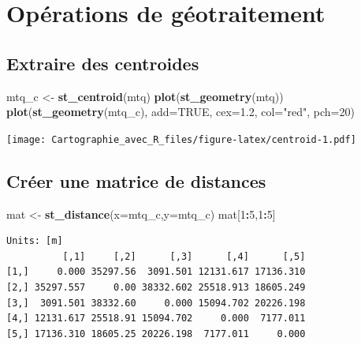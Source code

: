 \documentclass[]{book}
\newenvironment{Shaded}{\begin{snugshade}}{\end{snugshade}}
\newcommand{\KeywordTok}[1]{\textcolor[rgb]{0.13,0.29,0.53}{\textbf{#1}}}
\newcommand{\DataTypeTok}[1]{\textcolor[rgb]{0.13,0.29,0.53}{#1}}
\newcommand{\DecValTok}[1]{\textcolor[rgb]{0.00,0.00,0.81}{#1}}
\newcommand{\FloatTok}[1]{\textcolor[rgb]{0.00,0.00,0.81}{#1}}
\newcommand{\StringTok}[1]{\textcolor[rgb]{0.31,0.60,0.02}{#1}}
\newcommand{\OtherTok}[1]{\textcolor[rgb]{0.56,0.35,0.01}{#1}}
\newcommand{\OperatorTok}[1]{\textcolor[rgb]{0.81,0.36,0.00}{\textbf{#1}}}
\newcommand{\NormalTok}[1]{#1}
\begin{document}
\section{Opérations de géotraitement}\label{operations-de-geotraitement}

\subsection{Extraire des centroides}\label{extraire-des-centroides}

\begin{Shaded}
\begin{Highlighting}[]
\NormalTok{mtq_c <-}\StringTok{ }\KeywordTok{st_centroid}\NormalTok{(mtq)}
\KeywordTok{plot}\NormalTok{(}\KeywordTok{st_geometry}\NormalTok{(mtq))}
\KeywordTok{plot}\NormalTok{(}\KeywordTok{st_geometry}\NormalTok{(mtq_c), }\DataTypeTok{add=}\OtherTok{TRUE}\NormalTok{, }\DataTypeTok{cex=}\FloatTok{1.2}\NormalTok{, }\DataTypeTok{col=}\StringTok{"red"}\NormalTok{, }\DataTypeTok{pch=}\DecValTok{20}\NormalTok{)}
\end{Highlighting}
\end{Shaded}

\texttt{[image: Cartographie\_avec\_R\_files/figure-latex/centroid-1.pdf]}

\subsection{Créer une matrice de
distances}\label{creer-une-matrice-de-distances}

\begin{Shaded}
\begin{Highlighting}[]
\NormalTok{mat <-}\StringTok{ }\KeywordTok{st_distance}\NormalTok{(}\DataTypeTok{x=}\NormalTok{mtq_c,}\DataTypeTok{y=}\NormalTok{mtq_c)}
\NormalTok{mat[}\DecValTok{1}\OperatorTok{:}\DecValTok{5}\NormalTok{,}\DecValTok{1}\OperatorTok{:}\DecValTok{5}\NormalTok{]}
\end{Highlighting}
\end{Shaded}

\begin{verbatim}
Units: [m]
          [,1]     [,2]      [,3]      [,4]      [,5]
[1,]     0.000 35297.56  3091.501 12131.617 17136.310
[2,] 35297.557     0.00 38332.602 25518.913 18605.249
[3,]  3091.501 38332.60     0.000 15094.702 20226.198
[4,] 12131.617 25518.91 15094.702     0.000  7177.011
[5,] 17136.310 18605.25 20226.198  7177.011     0.000
\end{verbatim}
\end{document}
